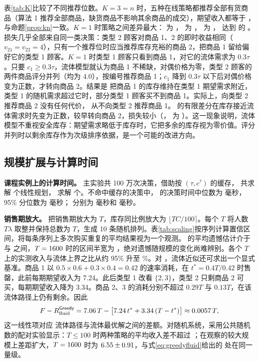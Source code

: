 

表\ref{tab:K}比较了不同推荐位数。$K=3=n$ 时，五种在线策略都推荐全部有货商品（算法 1 推荐全部商品，缺货商品不影响其余商品的成交），期望收入都等于 \KERthreeDual{}，与命题\ref{prop:kn}一致。$K=1$ 时策略之间差异最大：\Greedy{} 为 \KERoneGreedy，\LPDual{} 为 \KERoneDual，\LPFD{} 为 \KERoneFD，\IIDDP{} 达到 \SeqDP{} 的 \KVone。损失几乎全部来自同一类决策：类型 2 顾客对商品 1、2 的即时收益相同（$v_{21}=v_{22}=4$），只有一个推荐位时应当推荐库存充裕的商品 2，把商品 1 留给偏好它的类型 1 顾客。$K=1$ 时类型 1 顾客只看到商品 1，对它的流体需求为 $0.3\tau$。只要 $c_1\ge0.3\tau$，流体模型就认为商品 1 不稀缺，对偶价格为零，类型 2 顾客的两件商品评分并列（均为 4.0），按编号推荐商品 1；$c_1$ 降到 $0.3\tau$ 以下后对偶价格变为正数，才转向商品 2。结果是 \LPDual{} 把商品 1 的库存维持在类型 1 期望需求附近，类型 1 的随机需求超过它时，部分类型 1 顾客买不到商品 1。实际上，向类型 2 推荐商品 2 没有任何代价，\IIDDP{} 从不向类型 2 推荐商品 1。\LPFD{} 的有限差分在库存接近流体需求时先变为正数，较早转向商品 2，损失较小（\LossKoneFD{}，\LPDual{} 为 \LossKoneDual）。这一现象说明，流体模型不重视安全库存：期望需求略低于库存时，它把多余的库存视为零价值。评分并列时以剩余库存作为次级排序依据，是一个可能的改进方向。

\subsection{规模扩展与计算时间}\label{sec:scale}
\textbf{课程实例上的计算时间。} 主实验共 100 万次决策，借助按 $(\tau,c^{\tau})$ 的缓存，\LPDual{} 共求解 \SolvesDual{} 个线性规划，\LPFD{} 求解 \SolvesFD{} 个。不命中缓存的决策中，\LPDual{} 的决策时间中位数为 \TimeDualMedian{} 毫秒，95\% 分位数为 \TimeDualP{} 毫秒；\LPFD{} 分别为 \TimeFDMedian{} 毫秒和 \TimeFDP{} 毫秒。

\textbf{销售期放大。} 把销售期放大为 $T$，库存同比例放大为 $\lfloor TC/100\rceil$。每个 $T$ 将人数 $T\lambda$ 取整并保持总数为 $T$，生成 10 条随机排列。表\ref{tab:scaling}按序列计算置信区间，将每条序列上多次购买重复的平均结果视为一个观测。\LPDual{} 的平均遗憾估计介于 \ScaleGDualMin{} 与 \ScaleGDualMax{} 之间，$T=1600$ 时的区间半宽为 \ScaleDualHwMax，绝对遗憾随规模的变化尚难辨别。各个 $T$ 上的实测收入与流体上界之比从约 95\% 升至 \ScaleRatioMax\%。对 \Greedy{}，流体近似还可求出一个显式基准。商品 1 以 $0.5\times0.6+0.3\times0.4=0.42$ 的速率消耗，在 $t^{*}=0.4T/0.42$ 时售罄，此前每期期望收入为 7.24。此后类型 1 改看 $\{2,3\}$，类型 2 只剩商品 2 可买，每期期望收入降为 3.34。商品 2、3 的消耗分别不超过 $0.29T$ 与 $0.13T$，在该流体路径上仍有剩余。因此
\begin{equation}
F-R^{\textsf{Greedy}}_{\mathrm{fluid}}=7.06\,T-\bigl[7.24\,t^{*}+3.34\,(T-t^{*})\bigr]\approx0.0057\,T,
\label{eq:greedyfluid}
\end{equation}
这一线性项对应 \Greedy{} 流体路径与流体最优解之间的差额。对随机系统，采用公共随机数的配对实验显示：$T\le100$ 时两种策略的平均收入差不超过 \ScaleGapSmall；在观察的较大规模上差距扩大，$T=1600$ 时为 $6.55\pm0.91$，与式\eqref{eq:greedyfluid}给出的 \ScaleGreedyFluid{} 处在同一量级。

